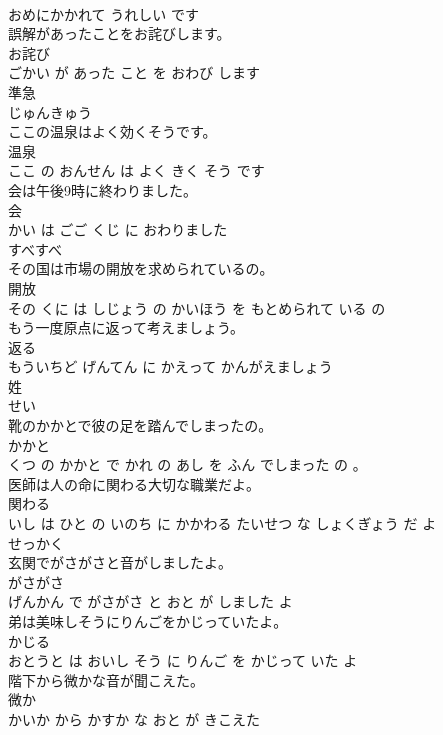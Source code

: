 \documentclass[8pt]{extreport}
\begin{document}
\begin{CJK}{UTF8}{min}
\\	おめにかかれて うれしい です			
\\	誤解があったことをお詫びします。	
\\	お詫び 
\\	ごかい が あった こと を おわび します			
\\	準急	
\\	じゅんきゅう			
\\	ここの温泉はよく効くそうです。	
\\	温泉 
\\	ここ の おんせん は よく きく そう です			
\\	会は午後9時に終わりました。	
\\	会 
\\	かい は ごご くじ に おわりました			
\\	すべすべ	
\\	その国は市場の開放を求められているの。	
\\	開放 
\\	その くに は しじょう の かいほう を もとめられて いる の			
\\	もう一度原点に返って考えましょう。	
\\	返る 
\\	もういちど げんてん に かえって かんがえましょう			
\\	姓	
\\	せい			
\\	靴のかかとで彼の足を踏んでしまったの。	
\\	かかと 
\\	くつ の かかと で かれ の あし を ふん でしまった の 。			
\\	医師は人の命に関わる大切な職業だよ。	
\\	関わる 
\\	いし は ひと の いのち に かかわる たいせつ な しょくぎょう だ よ			
\\	せっかく	
\\	玄関でがさがさと音がしましたよ。	
\\	がさがさ 
\\	げんかん で がさがさ と おと が しました よ			
\\	弟は美味しそうにりんごをかじっていたよ。	
\\	かじる 
\\	おとうと は おいし そう に りんご を かじって いた よ			
\\	階下から微かな音が聞こえた。	
\\	微か 
\\	かいか から かすか な おと が きこえた			

\end{CJK}
\end{document}
